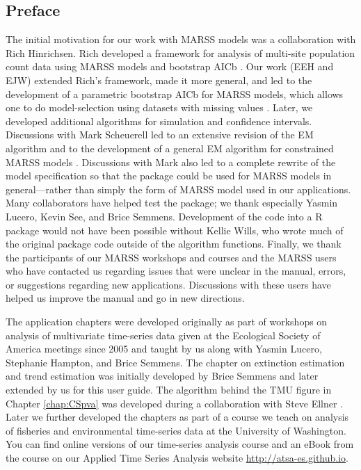 \subsection*{Preface}

The initial motivation for our work with MARSS models was a collaboration with Rich Hinrichsen. Rich developed a framework for analysis of multi-site population count data using MARSS models and bootstrap AICb \citep{HinrichsenHolmes2009}. Our work (EEH and EJW) extended Rich's framework, made it more general, and led to the development of a parametric bootstrap AICb for MARSS models, which allows one to do model-selection using datasets with missing values \citep{Wardetal2010, HolmesWard2010}.  Later, we developed additional algorithms for simulation and confidence intervals.  Discussions with Mark Scheuerell led to an extensive revision of the EM algorithm and to the development of a general EM algorithm for constrained MARSS models \citep{Holmes2010}.  Discussions with Mark also led to a complete rewrite of the model specification so that the package could be used for MARSS models in general---rather than simply the form of MARSS model used in our applications.  Many collaborators have helped test the package; we thank especially Yasmin Lucero, Kevin See, and Brice Semmens.  Development of the code into a R package would not have been possible without Kellie Wills, who wrote much of the original package code outside of the algorithm functions.  Finally, we thank the participants of our MARSS workshops and courses and the MARSS users who have contacted us regarding issues that were unclear in the manual, errors, or suggestions regarding new applications.  Discussions with these users have helped us improve the manual and go in new directions.

The application chapters were developed originally as part of workshops on analysis of multivariate time-series data given at the Ecological Society of America meetings since 2005 and taught by us along with Yasmin Lucero, Stephanie Hampton, and Brice Semmens.  The chapter on extinction estimation and trend estimation was initially developed by Brice Semmens and later extended by us for this user guide. The algorithm behind the TMU figure in Chapter \ref{chap:CSpva} was developed during a collaboration with Steve Ellner \citep{EllnerHolmes2008}.  Later we further developed the chapters as part of a course we teach on analysis of fisheries and environmental time-series data at the University of Washington.  You can find online versions of our time-series analysis course and an eBook from the course on our Applied Time Series Analysis website \url{http://atsa-es.github.io}.
 
